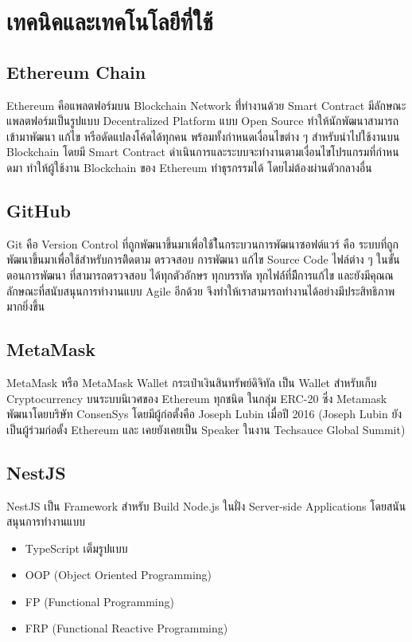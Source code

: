 \documentclass[12pt,oneside,openright,a4paper]{cpe-thai-project}
\begin{document}
\section{เทคนิคและเทคโนโลยีที่ใช้}

\subsection{Ethereum Chain  \cite{eth}} 
\tab Ethereum คือแพลตฟอร์มบน Blockchain Network ที่่ทํางานด้วย Smart Contract มีลักษณะแพลตฟอร์มเป็นรูปแบบ Decentralized Platform แบบ Open Source ทําให้นักพัฒนาสามารถเข้ามาพัฒนา แก้ไข หรือดัดแปลงโค้ดได้ทุกคน พร้อมทั้งกําหนดเงื่อนไขต่าง ๆ สําหรับนําไปใช้งานบน Blockchain โดยมี Smart Contract ดําเนินการและระบบจะทํางานตามเงื่อนไขโปรแกรมที่กําหนดมา ทําให้ผู้ใช้งาน Blockchain ของ Ethereum ทําธุรกรรมได้ โดยไม่ต้องผ่านตัวกลางอื่น

\subsection{GitHub  \cite{github}}
\tab Git คือ Version Control ที่ถูกพัฒนาขึ้นมาเพื่อใช้ใ้นกระบวนการพัฒนาซอฟต์แวร์ คือ ระบบที่ถูกพัฒนาขึ้นมาเพื่อใช้สำหรับการติิดตาม ตรวจสอบ การพัฒนา แก้ไข Source Code ไฟล์ต่าง ๆ ในขั้นตอนการพัฒนา ที่สามารถตรวจสอบ ได้ทุกตัวอักษร ทุกบรรทัด ทุกไฟล์์ที่มีีการแก้ไข และยังมีคุณณลักษณะที่สนับสนุนการทำงานแบบ Agile อีกด้วย จึงทำให้เราสามารถทำงานได้อย่างมีประสิทธิภาพมากยิ่งขึ้น

\subsection{MetaMask \cite{metamask}}
\tab MetaMask หรือ MetaMask Wallet กระเป๋าเงินสินทรัพย์ดิจิทัล เป็น Wallet สำหรับเก็บ Cryptocurrency บนระบบนิเวศของ Ethereum ทุกชนิด ในกลุ่ม ERC-20 ซึ่ง Metamask พัฒนาโดยบริษัท ConsenSys โดยมีผู้ก่อตั้งคือ Joseph Lubin เมื่อปี 2016 (Joseph Lubin ยังเป็นผู้ร่วมก่อตั้ง Ethereum และ เคยยังเคยเป็น Speaker ในงาน Techsauce Global Summit)

\subsection{NestJS \cite{nestjs}}
\tab NestJS เป็น Framework สำหรับ Build Node.js ในฝั่ง Server-side Applications โดยสนันสนุนการทำงานแบบ

	\begin{itemize}[leftmargin=0pt,itemindent=2.5cm]
		\item TypeScript เต็มรูปแบบ
		\item OOP (Object Oriented Programming)
		\item FP (Functional Programming)
		\item FRP (Functional Reactive Programming)
	\end{itemize}
\end{document}
